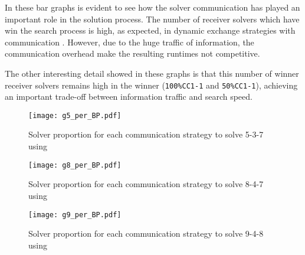 In these bar graphs is evident to see how the solver communication has played an important role in the solution process. The number of receiver solvers which have win the search process is high, as expected, in dynamic exchange strategies with communication \oneTn. However, due to the huge traffic of information, the communication overhead make the resulting runtimes not competitive. 

The other interesting detail showed in these graphs is that this number of winner receiver solvers remains high in the winner \commstrs{} (\texttt{100\%CC1-1} and \texttt{50\%CC1-1}), achieving an important trade-off between information traffic and search speed. 

\begin{figure}[!h]
\centering
\texttt{[image: g5\_per\_BP.pdf]}
\caption{Solver proportion for each communication strategy to solve \SGP{} 5-3-7 using \posl}\label{barplot:5}
\end{figure}

\begin{figure}[!h]
\centering
\texttt{[image: g8\_per\_BP.pdf]}
\caption{Solver proportion for each communication strategy to solve \SGP{} 8-4-7 using \posl}\label{barplot:8}
\end{figure}

\begin{figure}[!h]
\centering
\texttt{[image: g9\_per\_BP.pdf]}
\caption{Solver proportion for each communication strategy to solve \SGP{} 9-4-8 using \posl}\label{barplot:9}
\end{figure}